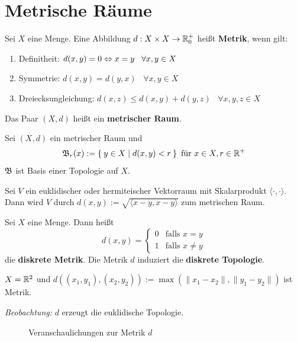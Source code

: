 \section{Metrische Räume}
\begin{definition}  
    Sei $X$ eine Menge. Eine Abbildung $d:X\times X \rightarrow \mathbb{R}_0^+$
    heißt \textbf{Metrik}, wenn gilt:

    \begin{enumerate}[label=(\roman*)]
        \item Definitheit:         \tabto{4cm} $d(x,y) = 0 \Leftrightarrow x = y \;\;\; \forall x, y \in X$
        \item Symmetrie:           \tabto{4cm} $d(x,y) = d(y,x) \;\;\; \forall x, y \in X$
        \item Dreiecksungleichung: \tabto{4cm} $d(x,z) \leq d(x,y) + d(y,z) \;\;\; \forall x, y, z \in X$
    \end{enumerate}

    Das Paar $(X, d)$ heißt ein \textbf{metrischer Raum}.
\end{definition}

\begin{bemerkung}
    Sei $(X, d)$ ein metrischer Raum und
    \[\mathfrak{B}_r(x) := \Set{y \in X | d(x,y) < r} \text{ für } x \in X, r \in \mathbb{R}^+\]
    $\mathfrak{B}$ ist Basis einer Topologie auf $X$.
\end{bemerkung}

\begin{beispiel}
    Sei $V$ ein euklidischer oder hermiteischer Vektorraum mit Skalarprodukt
    $\langle \cdot , \cdot \rangle$.
    Dann wird $V$ durch $d(x,y) := \sqrt{\langle x-y, x-y \rangle}$ zum metrischen Raum.
\end{beispiel}

\begin{beispiel}  
    Sei $X$ eine Menge. Dann heißt
    \[d(x,y) = \begin{cases}
    0 & \text{falls } x=y\\
    1 & \text{falls } x \neq y
    \end{cases}\]
    die \textbf{diskrete Metrik}. Die Metrik $d$ induziert die 
    \textbf{diskrete Topologie}.
\end{beispiel}

\begin{beispiel}
    $X = \mathbb{R}^2$ und $d\left ((x_1, y_1), (x_2, y_2)\right ) := \max(\|x_1 - x_2\|, \|y_1 - y_2\|)$
    ist Metrik.

    \emph{Beobachtung:} $d$ erzeugt die euklidische Topologie.

    \begin{figure}[ht]
        \centering
        \subfloat[$\fB_r(0)$]{
            
            \label{fig:open-square}
        }%
        \label{fig:metrik}
        \caption{Veranschaulichungen zur Metrik $d$}
    \end{figure}

\end{beispiel}

